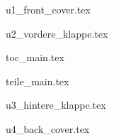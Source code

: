 \documentclass{skript}
\begin{document}

{u1_front_cover.tex}

{u2_vordere_klappe.tex}

{toc_main.tex}

{teile_main.tex}

{u3_hintere_klappe.tex}

{u4_back_cover.tex}
	
\end{document}
